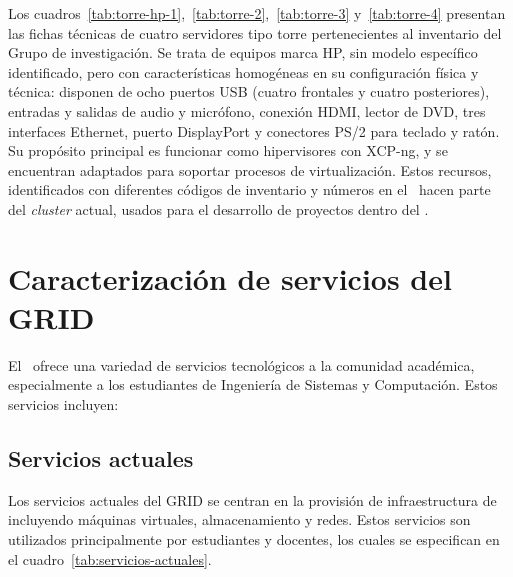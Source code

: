 \noindent
Los cuadros~\ref{tab:torre-hp-1},~\ref{tab:torre-2},~\ref{tab:torre-3} y~\ref{tab:torre-4} presentan las fichas técnicas de cuatro servidores tipo torre pertenecientes al inventario del Grupo de investigación. Se trata de equipos marca HP, sin modelo específico identificado, pero con características homogéneas en su configuración física y técnica: disponen de ocho puertos USB (cuatro frontales y cuatro posteriores), entradas y salidas de audio y micrófono, conexión HDMI, lector de DVD, tres interfaces Ethernet, puerto DisplayPort y conectores PS/2 para teclado y ratón. Su propósito principal es funcionar como hipervisores con XCP-ng, y se encuentran adaptados para soportar procesos de virtualización. Estos recursos, identificados con diferentes códigos de inventario y números en el \CPD\, hacen parte del \textit{cluster} actual, usados para el desarrollo de proyectos dentro del \GRID.


\section{Caracterización de servicios del GRID}\label{sec:caracterizacion-servicios}
\noindent
El \GRID\ ofrece una variedad de servicios tecnológicos a la comunidad académica, especialmente a los estudiantes de Ingeniería de Sistemas y Computación. Estos servicios incluyen:

\subsection{Servicios actuales}
\noindent
Los servicios actuales del GRID se centran en la provisión de infraestructura de \TI\, incluyendo máquinas virtuales, almacenamiento y redes. Estos servicios son utilizados principalmente por estudiantes y docentes, los cuales se especifican en el cuadro~\ref{tab:servicios-actuales}.

